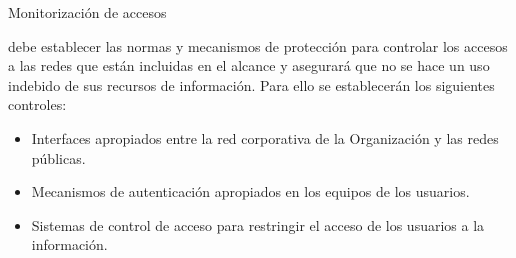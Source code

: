 \begin{enumerate}[label=\alph*)]
    \begin{table}[H]
        \centering
        \small
        \caption{Monitorización de accesos}
        \label{tab:guia-sgsi-monitorización-accesos}
        \normalsize
    \end{table}

    \Beneficiario{} debe establecer las normas y mecanismos de protección para controlar los accesos a las redes que están incluidas en el alcance y asegurará que no se hace un uso indebido de sus recursos de información. Para ello se establecerán los siguientes controles:

    \begin{itemize}
        \item Interfaces apropiados entre la red corporativa de la Organización y las redes públicas.
        \item Mecanismos de autenticación apropiados en los equipos de los usuarios.
        \item Sistemas de control de acceso para restringir el acceso de los usuarios a la información.
    \end{itemize}


\end{enumerate}
